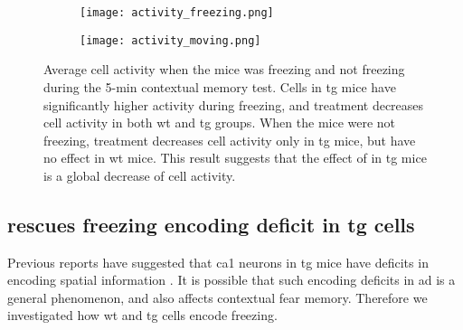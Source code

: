 \begin{figure}[h]
    \begin{subfigure}[h]{\textwidth}
        \texttt{[image: activity\_freezing.png]}
        \caption{\label{f.ad.actf}}
    \end{subfigure}
    \begin{subfigure}[h]{\textwidth}
        \texttt{[image: activity\_moving.png]}
        \caption{\label{f.ad.actnf}}
    \end{subfigure}
    \caption[Cell activity during freezing.]{Average cell activity when the mice was  freezing and  not freezing during the 5-min contextual memory test. Cells in \gls{tg} mice have significantly higher activity during freezing, and \tglu{} treatment decreases cell activity in both \gls{wt} and \gls{tg} groups. When the mice were not freezing, \tglu{} treatment decreases cell activity only in \gls{tg} mice, but have no effect in \gls{wt} mice. This result suggests that the effect of \tglu{} in \gls{tg} mice is a global decrease of cell activity. \label{f.ad.activity_freezing}}
\end{figure}
\begin{comment}
\begin{figure}[h]
    \texttt{[image: sample\_trace.png]}
    \caption{Sample calcium transients from cells with highest freezing information in a mouse. It appears that cells encode freezing by decreasing their activity. \label{f.ad.sample_trace}}
\end{figure}
\begin{figure}[h]
    \texttt{[image: ch\_activity.png]}
    \caption{Distribution and mean of activity difference between not-freezing and freezing. This confirms the intuition from Figure~\ref{f.ad.sample_trace} that most of the cells decrease activity during freezing. \label{f.ad.ch_activity}}
\end{figure}
\end{comment}

\subsection{\tglu{} rescues freezing encoding deficit in \gls{tg} cells}

Previous reports have suggested that \gls{ca1} neurons in \gls{tg} mice have deficits in encoding spatial information \citep{cheng13}. It is possible that such encoding deficits in \gls{ad} is a general phenomenon, and also affects contextual fear memory. Therefore we investigated how \gls{wt} and \gls{tg} cells encode freezing. 

